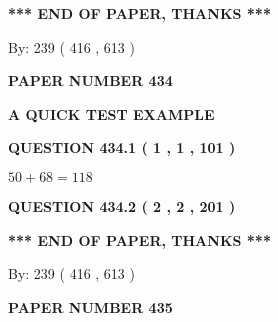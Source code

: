 \documentclass[12pt]{article}
\begin{document}
   
   
   
   
\vspace{1.0in} 
{\textbf{\large{ *** END OF PAPER, THANKS *** }}} 
   
   
\hspace{1.0in} By: 
 239 ( 416 ,  613 )
   
   
   
   
\newpage 
\setcounter{page}{ 
   434001 } 
   
   
   
   
 {\textbf{ \Large{ PAPER NUMBER  434  }}}
   
   
\vspace{0.2in}
   
   
   
   
   
   
 \vspace{0.2in}
{\LARGE {\textbf{ A QUICK TEST EXAMPLE}}}
   
   
  
\vspace{0.2in}
  
{\textbf{\Large{QUESTION
434.1 
 ( 1 , 1 , 101 )
}}}
  
  
 
 

$ %
50 +  %
68=   %
118$
 
 
  
\vspace{0.2in}
  
{\textbf{\Large{QUESTION
434.2 
 ( 2 , 2 , 201 )
}}}
  
  
   
   
 \vspace{0.2in}
 
   
   
   
   
\vspace{1.0in} 
{\textbf{\large{ *** END OF PAPER, THANKS *** }}} 
   
   
\hspace{1.0in} By: 
 239 ( 416 ,  613 )
   
   
   
   
\newpage 
\setcounter{page}{ 
   435001 } 
   
   
   
   
 {\textbf{ \Large{ PAPER NUMBER  435  }}}
   
\end{document}
